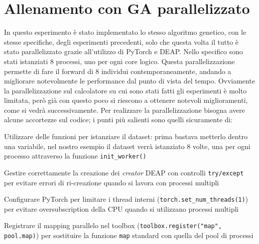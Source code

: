 \section{Allenamento con GA parallelizzato}
 In questo esperimento è stato implementato lo stesso algoritmo genetico, con le stesse specifiche, degli esperimenti precedenti, solo che questa volta il tutto è stato
 parallelizzato grazie all'utilizzo di PyTorch e DEAP. Nello specifico sono stati istanziati 8 processi, uno per ogni core logico. Questa parallelizzazione permette
 di fare il forward di 8 individui contemporaneamente, andando a migliorare notevolmente le performance dal punto di vista del tempo. Ovviamente la parallelizzazione sul
 calcolatore su cui sono stati fatti gli esperimenti è molto limitata, però già con questo poco si riescono a ottenere notevoli miglioramenti, come si vedrà successivamente.
 Per realizzare la parallelizzazione bisogna avere alcune accortezze sul codice; i punti più salienti sono quelli sicuramente di:
\begin{compactitemize}
\item Utilizzare delle funzioni per istanziare il dataset: prima bastava metterlo dentro una variabile, nel nostro esempio il dataset verrà istanziato 8 volte, una per ogni processo attraverso la funzione \texttt{init\_worker()}
\item Gestire correttamente la creazione dei \textit{creator} DEAP con controlli \texttt{try/except} per evitare errori di ri-creazione quando si lavora con processi multipli
\item Configurare PyTorch per limitare i thread interni (\texttt{torch.set\_num\_threads(1)}) per evitare oversubscription della CPU quando si utilizzano processi multipli
\item Registrare il mapping parallelo nel toolbox (\texttt{toolbox.register("map", pool.map)}) per sostituire la funzione \texttt{map} standard con quella del pool di processi
\end{compactitemize}


